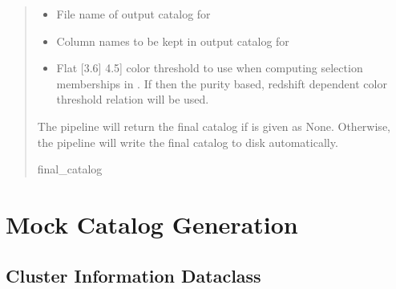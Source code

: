 \documentclass[letterpaper,12pt,english]{sphinxmanual}
\begin{document}
\begin{fulllineitems}
\begin{fulllineitems}
\begin{quote}
\begin{description}
\begin{itemize}
\item {} 
\sphinxAtStartPar
{} \textendash{} File name of output catalog for 

\item {} 
\sphinxAtStartPar
{} \textendash{} Column names to be kept in output catalog for 

\item {} 
\sphinxAtStartPar
{} \textendash{} Flat {[}3.6{]} \sphinxhyphen{}{[}4.5{]} color threshold to use when computing selection memberships in .
If  then the purity based, redshift dependent color threshold relation will be used.

\end{itemize}

\sphinxAtStartPar
The pipeline will return the final catalog if  is given as None. Otherwise, the pipeline will
write the final catalog to disk automatically.

\sphinxAtStartPar
final\_catalog

\end{description}\end{quote}

\end{fulllineitems}


\end{fulllineitems}


\sphinxstepscope


\chapter{Mock Catalog Generation}
\label{\detokenize{api/mock:mock-catalog-generation}}\label{\detokenize{api/mock:mock}}\label{\detokenize{api/mock::doc}}

\section{Cluster Information Dataclass}
\label{\detokenize{api/mock:cluster-information-dataclass}}
\end{document}
